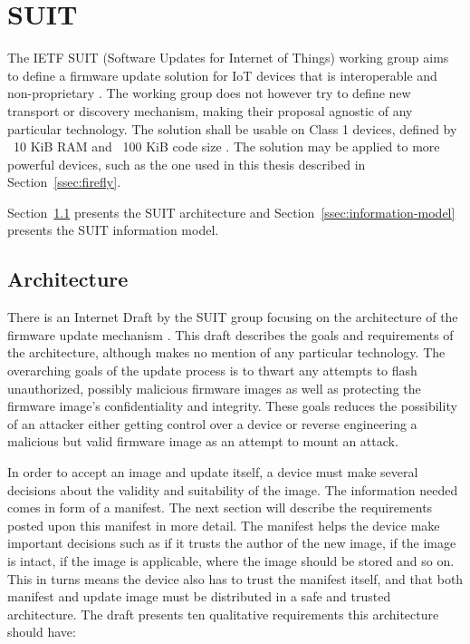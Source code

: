 \documentclass[0-thesis.tex]{subfiles}
\begin{document}
\section{SUIT}
\label{sec:suit}
The IETF SUIT (Software Updates for Internet of Things) working group aims to define a
firmware update solution for IoT devices that is interoperable and non-proprietary
\parencite{suit}. The working group does not however try to define new transport or
discovery mechanism, making their proposal agnostic of any particular technology. The
solution shall be usable on Class 1 devices, defined by ~10 KiB RAM and ~100 KiB code size
\parencite{rfc7228}. The solution may be applied to more powerful devices, such as the one
used in this thesis described in Section~\ref{ssec:firefly}.

Section~\ref{ssec:architecture} presents the SUIT architecture and
Section~\ref{ssec:information-model} presents the SUIT information model.

\subsection{Architecture}
\label{ssec:architecture}
There is an Internet Draft by the SUIT group focusing on the architecture of the firmware
update mechanism \parencite{suit-architecture}. This draft describes the goals and
requirements of the architecture, although makes no mention of any particular technology.
The overarching goals of the update process is to thwart any attempts to flash
unauthorized, possibly malicious firmware images as well as protecting the firmware
image's confidentiality and integrity. These goals reduces the possibility of an attacker
either getting control over a device or reverse engineering a malicious but valid firmware
image as an attempt to mount an attack.

In order to accept an image and update itself, a device must make several decisions about
the validity and suitability of the image. The information needed comes in form of a
manifest. The next section will describe the requirements posted upon this manifest in
more detail. The manifest helps the device make important decisions such as if it trusts
the author of the new image, if the image is intact, if the image is applicable, where the
image should be stored and so on. This in turns means the device also has to trust the
manifest itself, and that both manifest and update image must be distributed in a safe and
trusted architecture. The draft \parencite{suit-architecture} presents ten qualitative
requirements this architecture should have:
\end{document}
